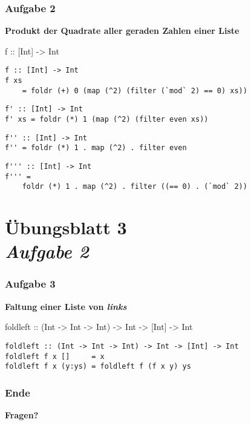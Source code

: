 \documentclass{beamer}
\begin{document}
\begin{frame}[t, fragile] \frametitle{Aufgabe 2}
	\textbf{Produkt der Quadrate aller geraden Zahlen einer Liste} \\
	\begin{ttfamily}
		f :: [Int] -> Int
	\end{ttfamily}
	
	\pause \bigskip
	
	\begin{lstlisting}
f :: [Int] -> Int
f xs 
	= foldr (+) 0 (map (^2) (filter (`mod` 2) == 0) xs))
	\end{lstlisting}
	\pause
	\begin{lstlisting}
f' :: [Int] -> Int
f' xs = foldr (*) 1 (map (^2) (filter even xs))
	\end{lstlisting}
	\pause
	\begin{lstlisting}
f'' :: [Int] -> Int
f'' = foldr (*) 1 . map (^2) . filter even
	\end{lstlisting}
	\begin{lstlisting}
f''' :: [Int] -> Int
f''' = 
	foldr (*) 1 . map (^2) . filter ((== 0) . (`mod` 2))
	\end{lstlisting}
\end{frame}




\section{Übungsblatt 3 \\ \textit{\normalsize Aufgabe 2}}

\begin{frame}[t, fragile] \frametitle{Aufgabe 3}
	\textbf{Faltung einer Liste von \textit{links}} \\
	\begin{ttfamily} \small
		foldleft ::  (Int -> Int -> Int) -> Int -> [Int] -> Int
	\end{ttfamily}
	
	
	\pause \bigskip
	
	\begin{lstlisting}
foldleft :: (Int -> Int -> Int) -> Int -> [Int] -> Int
foldleft f x []     = x
foldleft f x (y:ys) = foldleft f (f x y) ys
	\end{lstlisting}
\end{frame}


\begin{frame} \frametitle{Ende}
	\centering
	\textbf{Fragen?}
\end{frame}
\end{document}
